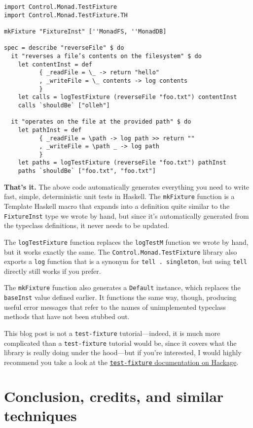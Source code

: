 \begin{verbatim}
import Control.Monad.TestFixture
import Control.Monad.TestFixture.TH

mkFixture "FixtureInst" [''MonadFS, ''MonadDB]

spec = describe "reverseFile" $ do
  it "reverses a file’s contents on the filesystem" $ do
    let contentInst = def
          { _readFile = \_ -> return "hello"
          , _writeFile = \_ contents -> log contents
          }
    let calls = logTestFixture (reverseFile "foo.txt") contentInst
    calls `shouldBe` ["olleh"]

  it "operates on the file at the provided path" $ do
    let pathInst = def
          { _readFile = \path -> log path >> return ""
          , _writeFile = \path _ -> log path
          }
    let paths = logTestFixture (reverseFile "foo.txt") pathInst
    paths `shouldBe` ["foo.txt", "foo.txt"]
\end{verbatim}
\textbf{That's it.} The above code automatically generates everything
you need to write fast, simple, deterministic unit tests in Haskell. The
\texttt{mkFixture} function is a Template Haskell macro that expands
into a definition quite similar to the \texttt{FixtureInst} type we
wrote by hand, but since it's automatically generated from the typeclass
definitions, it never needs to be updated.

The \texttt{logTestFixture} function replaces the \texttt{logTestM}
function we wrote by hand, but it works exactly the same. The
\texttt{Control.Monad.TestFixture} library also exports a \texttt{log}
function that is a synonym for \texttt{tell\ .\ singleton}, but using
\texttt{tell} directly still works if you prefer.

The \texttt{mkFixture} function also generates a \texttt{Default}
instance, which replaces the \texttt{baseInst} value defined earlier. It
functions the same way, though, producing useful error messages that
refer to the names of unimplemented typeclass methods that have not been
stubbed out.

This blog post is not a \texttt{test-fixture} tutorial---indeed, it is
much more complicated than a \texttt{test-fixture} tutorial would be,
since it covers what the library is really doing under the hood---but if
you're interested, I would highly recommend you take a look at the
\href{http://hackage.haskell.org/package/test-fixture}{\texttt{test-fixture}
documentation on Hackage}.

\section{Conclusion, credits, and similar
techniques}
\label{conclusion-credits-and-similar-techniques}

